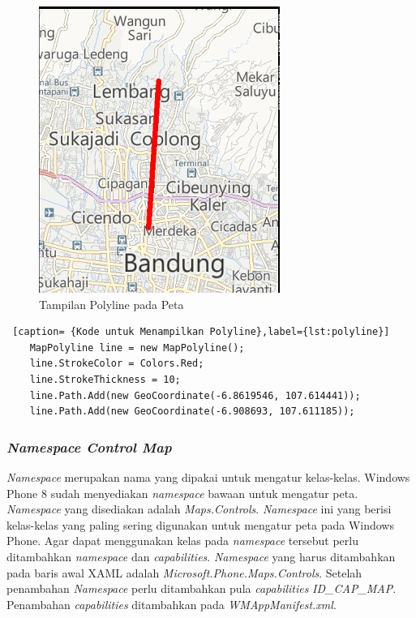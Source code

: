 \begin{figure}[h]
	\centering
		\includegraphics[scale=0.5]{Gambar/kontrol/polyline}
	\caption{Tampilan Polyline pada Peta}
	\label{fig:TampilanpolylinepadaPeta}
\end{figure}

\begin{lstlisting} [caption= {Kode untuk Menampilkan Polyline},label={lst:polyline}]
	MapPolyline line = new MapPolyline();
	line.StrokeColor = Colors.Red;
	line.StrokeThickness = 10;
	line.Path.Add(new GeoCoordinate(-6.8619546, 107.614441));
	line.Path.Add(new GeoCoordinate(-6.908693, 107.611185));
\end{lstlisting}

\subsubsection{\textit{Namespace Control Map}}
\label{subsubsec:Namespace Control Map}
\hspace{0.5cm} \textit{Namespace} merupakan nama yang dipakai untuk mengatur kelas-kelas. Windows Phone 8 sudah menyediakan \textit{namespace} bawaan untuk mengatur peta. \textit{Namespace} yang disediakan adalah \textit{Maps.Controls}. \textit{Namespace} ini yang berisi kelas-kelas yang paling sering digunakan untuk mengatur peta pada Windows Phone.  Agar dapat menggunakan kelas pada \textit{namespace} tersebut perlu ditambahkan \textit{namespace} dan \textit{capabilities}. \textit{Namespace} yang harus ditambahkan pada baris awal XAML adalah \textit{Microsoft.Phone.Maps.Controls}. Setelah penambahan \textit{Namespace} perlu ditambahkan pula \textit{capabilities} \textit{ID\_CAP\_MAP}. Penambahan \textit{capabilities} ditambahkan pada \textit{WMAppManifest.xml}.

